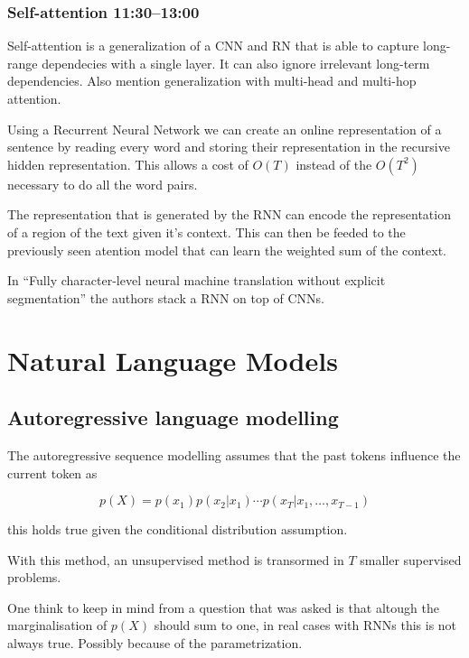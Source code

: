 \subsubsection{Self-attention 11:30--13:00}

Self-attention is a generalization of a CNN and RN that is able to capture
long-range dependecies with a single layer. It can also ignore irrelevant
long-term dependencies. Also mention generalization with multi-head and
multi-hop attention.

Using a Recurrent Neural Network we can create an online representation of a
sentence by reading every word and storing their representation in the
recursive hidden representation. This allows a cost of $O(T)$ instead of the
$O(T^2)$ necessary to do all the word pairs.

The representation that is generated by the RNN can encode the representation
of a region of the text given it's context. This can then be feeded to the
previously seen atention model that can learn the weighted sum of the context.

In ``Fully character-level neural machine translation without explicit
segmentation'' \cite{lee2016fully} the authors stack a RNN on top of CNNs.

\section{Natural Language Models}

\subsection{Autoregressive language modelling}

The autoregressive sequence modelling assumes that the past tokens influence
the current token as

\begin{equation}
  p(X) = p(x_1)p(x_2|x_1)\cdots p(x_T|x_1,\dots,x_{T-1})
\end{equation}

this holds true given the conditional distribution assumption.

With this method, an unsupervised method is transormed in $T$ smaller
supervised problems.

One think to keep in mind from a question that was asked is that altough the
marginalisation of $p(X)$ should sum to one, in real cases with RNNs this is
not always true. Possibly because of the parametrization.

